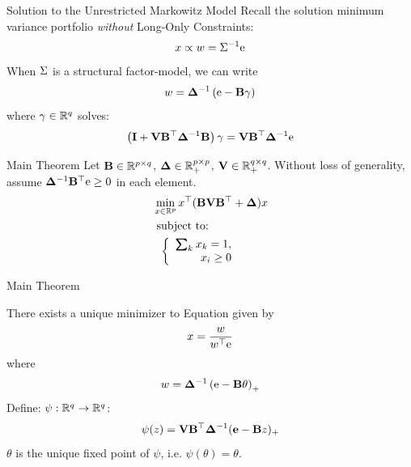 \documentclass[11pt,leqno]{beamer}
\begin{document}
\begin{frame}{Solution to the Unrestricted Markowitz Model}
Recall the solution minimum variance portfolio \textit{without} Long-Only Constraints:
\begin{equation}
x \propto w = \Sigma^{-1} \mathrm{e}
\end{equation}
When $\Sigma$ is a structural factor-model, we can write
\begin{equation}
w = \bm{\Delta}^{-1}\left(\mathrm{e} - \mathbf{B} \gamma\right)
\end{equation}
where $\gamma \in \mathbb{R}^q$ solves:
\begin{equation} \label{theta_ls}
\left(\mathbf{I} + \mathbf{V} \mathbf{B}^\top \bm{\Delta}^{-1} \mathbf{B}\right) \gamma = \mathbf{V} \mathbf{B}^\top \bm{\Delta}^{-1} \mathrm{e}
\end{equation}
\end{frame}




\begin{frame}{Main Theorem}
Let $\mathbf{B} \in \mathbb{R}^{p\times q}$, $\bm{\Delta} \in \mathbb{R}^{p \times p}_+$,  $\mathbf{V} \in \mathbb{R}^{q \times q}_+$. Without loss of generality, assume $\bm{\Delta}^{-1}\mathbf{B}^\top \mathrm{e}\geq 0$ in each element. 
\begin{equation}
\begin{aligned}
 &\min_{x \in \bbr^p} x^\top (\bB \bV \bB^\T  + \Gd)x\\
  &\text{ subject to:} \\
  &\hspace{0.08in}\left\{
	\begin{array}{r}
	 \textstyle\sum\nolimits_k \hpt x_k =1 , \\
	 x_i \geq 0
	\end{array} 
\right. \label{con}
\end{aligned}
\end{equation}

\end{frame}

\begin{frame}{Main Theorem}
\begin{theorem}

There exists a unique minimizer to Equation  given by
\begin{equation}
x = \frac{w}{w^\top \mathrm{e}}
\end{equation}
where 
\begin{equation}
w = \bm{\Delta}^{-1}\left(\mathrm{e} - \mathbf{B} \theta\right)_+
\end{equation}
Define: $\psi: \mathbb{R}^q \to \mathbb{R}^q$:
\begin{equation} 
\psi(z)= \mathbf{V} \mathbf{B}^\top \bm{\Delta}^{-1}(\mathbf{e} - \mathbf{B} z)_+
\end{equation}
 $\theta$ is the unique fixed point of $\psi$, i.e. $\psi(\theta)=\theta$.
\end{theorem}
\end{frame}
\end{document}
